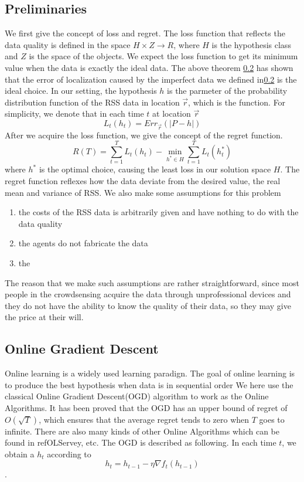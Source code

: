 \documentclass[10pt,conference,compsocconf,letterpaper]{IEEEtran}
\begin{document}
\subsection{Preliminaries}
We first give the concept of loss and regret. The loss function that reflects the data quality is defined in the space $H\times Z\to R$, where $H$ is the hypothesis class and $Z$ is the space of the objects. We expect the loss function to get its minimum value when the data is exactly the ideal data. The above theorem \ref{} has shown that the error of localization caused by the imperfect data we defined in\ref{} is the ideal choice. In our setting, the hypothesis $h$ is the parmeter of the probability distribution function of the RSS data in location $\vec r$, which is the function. For simplicity, we denote that in each time $t$ at location $\vec r$
\begin{equation}
L_t(h_t)=Err_{\vec r}(|P-h|)
\end{equation}
 After we acquire the loss function, we give the concept of the regret function.
\begin{equation}\label{def:reg}
R(T)=\sum_{t=1}^TL_t(h_t)-\min_{h^*\in H}\sum_{t=1}^TL_t(h^*_t)
\end{equation}
where $h^*$ is the optimal choice, causing the least loss in our solution space $H$. The regret function reflexes how the data deviate from the desired value, the real mean and variance of RSS. We also make some assumptions for this problem
\begin{enumerate}
\item the costs of the RSS data is arbitrarily given and have nothing to do with the data quality
\item the agents do not fabricate the data
\item the 
\end{enumerate}
The reason that we make such assumptions are rather straightforward, since most people in the crowdsensing acquire the data through unprofessional devices and they do not have the ability to know the quality of their data, so they may give the price at their will. 

\subsection{Online Gradient Descent}
Online learning is a widely used learning paradign. The goal of online learning is to produce the best hypothesis when data is in sequential order
We here use the classical Online Gradient Descent(OGD) algorithm to work as the Online Algorithms. It has been proved that the OGD has an upper bound of regret of $O(\sqrt{T})$, which ensures that the average regret tends to zero when $T$ goes to infinite. There are also many kinds of other Online Algorithms which can be found in ref{OLServey}, etc. The OGD is described as following. In each time $t$, we obtain a $h_t$ according to
\begin{equation}
h_t=h_{t-1}-\eta \nabla f_t(h_{t-1})
\end{equation}.
\end{document}
